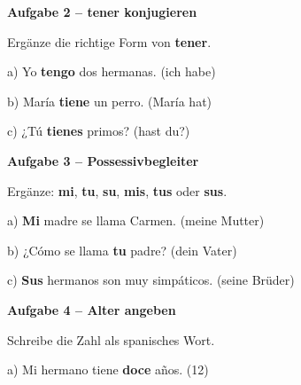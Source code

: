 \documentclass[11pt, a4paper]{article}
\newcommand{\fachfarbe}{spanisch}
\newcommand{\punktebox}[1]{\hfill\fbox{\small \_/#1}}
\newcommand{\lsg}[1]{\textcolor{loesung}{\textbf{#1}}}
\newenvironment{aufgabe}[1]{%
    \needspace{5\baselineskip}%
    \nopagebreak[4]%
    \vspace{10pt}
    \noindent\textbf{\textcolor{\fachfarbe}{Aufgabe #1}}
    \nopagebreak[4]%
    \vspace{5pt}
    \nopagebreak[4]%
    \begin{list}{}{\leftmargin=0pt}
    \item[]
}{%
    \end{list}
}
\newcommand{\es}[1]{\textcolor{\fachfarbe}{\textbf{#1}}}
\begin{document}

\begin{aufgabe}{2 -- tener konjugieren}
Ergänze die richtige Form von \es{tener}. \punktebox{6}
\end{aufgabe}

\noindent
a) Yo \lsg{tengo} dos hermanas. \hfill (ich habe)

\vspace{0.8em}

\noindent
b) María \lsg{tiene} un perro. \hfill (María hat)

\vspace{0.8em}

\noindent
c) ¿Tú \lsg{tienes} primos? \hfill (hast du?)

\vspace{15pt}


\begin{aufgabe}{3 -- Possessivbegleiter}
Ergänze: \es{mi}, \es{tu}, \es{su}, \es{mis}, \es{tus} oder \es{sus}. \punktebox{6}
\end{aufgabe}

\noindent
a) \lsg{Mi} madre se llama Carmen. \hfill (meine Mutter)

\vspace{0.8em}

\noindent
b) ¿Cómo se llama \lsg{tu} padre? \hfill (dein Vater)

\vspace{0.8em}

\noindent
c) \lsg{Sus} hermanos son muy simpáticos. \hfill (seine Brüder)

\vspace{15pt}


\begin{aufgabe}{4 -- Alter angeben}
Schreibe die Zahl als spanisches Wort. \punktebox{6}
\end{aufgabe}

\noindent
a) Mi hermano tiene \lsg{doce} años. \hfill (12)
\end{document}
